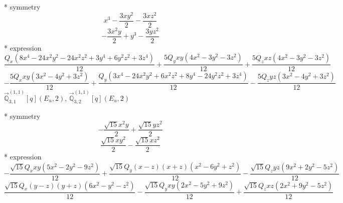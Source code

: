 \documentclass[fleqn,8pt]{jsarticle}
\begin{document}
\noindent\quad ** symmetry
\begin{dmath*}
x^{3} - \frac{3 x y^{2}}{2} - \frac{3 x z^{2}}{2}
\end{dmath*}
\begin{dmath*}
- \frac{3 x^{2} y}{2} + y^{3} - \frac{3 y z^{2}}{2}
\end{dmath*}
\noindent\quad ** expression
\begin{dmath*}
\frac{Q_{x} \left(8 x^{4} - 24 x^{2} y^{2} - 24 x^{2} z^{2} + 3 y^{4} + 6 y^{2} z^{2} + 3 z^{4}\right)}{12} + \frac{5 Q_{y} x y \left(4 x^{2} - 3 y^{2} - 3 z^{2}\right)}{12} + \frac{5 Q_{z} x z \left(4 x^{2} - 3 y^{2} - 3 z^{2}\right)}{12}
\end{dmath*}
\begin{dmath*}
- \frac{5 Q_{x} x y \left(3 x^{2} - 4 y^{2} + 3 z^{2}\right)}{12} + \frac{Q_{y} \left(3 x^{4} - 24 x^{2} y^{2} + 6 x^{2} z^{2} + 8 y^{4} - 24 y^{2} z^{2} + 3 z^{4}\right)}{12} - \frac{5 Q_{z} y z \left(3 x^{2} - 4 y^{2} + 3 z^{2}\right)}{12}
\end{dmath*}
\noindent\quad $\vec{\mathbb{Q}}_{3,1}^{(1,1)}[q](E_{u},2)$, $\vec{\mathbb{Q}}_{3,2}^{(1,1)}[q](E_{u},2)$

\noindent\quad ** symmetry
\begin{dmath*}
- \frac{\sqrt{15} x^{2} y}{2} + \frac{\sqrt{15} y z^{2}}{2}
\end{dmath*}
\begin{dmath*}
\frac{\sqrt{15} x y^{2}}{2} - \frac{\sqrt{15} x z^{2}}{2}
\end{dmath*}
\noindent\quad ** expression
\begin{dmath*}
- \frac{\sqrt{15} Q_{x} x y \left(5 x^{2} - 2 y^{2} - 9 z^{2}\right)}{12} + \frac{\sqrt{15} Q_{y} \left(x - z\right) \left(x + z\right) \left(x^{2} - 6 y^{2} + z^{2}\right)}{12} - \frac{\sqrt{15} Q_{z} y z \left(9 x^{2} + 2 y^{2} - 5 z^{2}\right)}{12}
\end{dmath*}
\begin{dmath*}
\frac{\sqrt{15} Q_{x} \left(y - z\right) \left(y + z\right) \left(6 x^{2} - y^{2} - z^{2}\right)}{12} - \frac{\sqrt{15} Q_{y} x y \left(2 x^{2} - 5 y^{2} + 9 z^{2}\right)}{12} + \frac{\sqrt{15} Q_{z} x z \left(2 x^{2} + 9 y^{2} - 5 z^{2}\right)}{12}
\end{dmath*}
\end{document}
